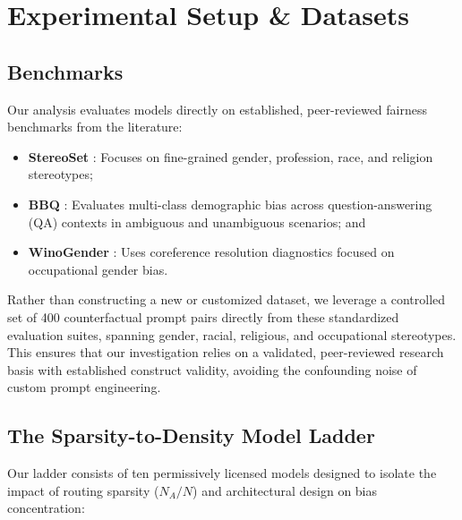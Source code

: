 \documentclass[11pt,a4paper]{article}
\begin{document}
\section{Experimental Setup \& Datasets}
\subsection{Benchmarks}
Our analysis evaluates models directly on established, peer-reviewed fairness benchmarks from the literature:
\begin{itemize}
    \item \textbf{StereoSet} \cite{stereoset}: Focuses on fine-grained gender, profession, race, and religion stereotypes;
    \item \textbf{BBQ} \cite{bbq}: Evaluates multi-class demographic bias across question-answering (QA) contexts in ambiguous and unambiguous scenarios; and
    \item \textbf{WinoGender} \cite{winogender}: Uses coreference resolution diagnostics focused on occupational gender bias.
\end{itemize}
Rather than constructing a new or customized dataset, we leverage a controlled set of 400 counterfactual prompt pairs directly from these standardized evaluation suites, spanning gender, racial, religious, and occupational stereotypes. This ensures that our investigation relies on a validated, peer-reviewed research basis with established construct validity, avoiding the confounding noise of custom prompt engineering.

\subsection{The Sparsity-to-Density Model Ladder}
Our ladder consists of ten permissively licensed models designed to isolate the impact of routing sparsity ($N_A/N$) and architectural design on bias concentration:
\end{document}
